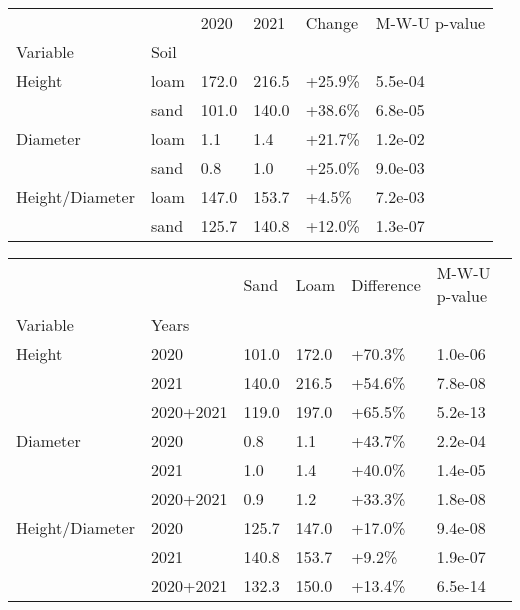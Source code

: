\documentclass[11pt]{article}
\begin{document}
\begin{tabular}{llllll}
\toprule
                &      &   2020 &   2021 &  Change & M-W-U p-value \\
Variable & Soil &        &        &         &               \\
\midrule
Height & loam &  172.0 &  216.5 &  +25.9\% &       5.5e-04 \\
                & sand &  101.0 &  140.0 &  +38.6\% &       6.8e-05 \\
Diameter & loam &    1.1 &    1.4 &  +21.7\% &       1.2e-02 \\
                & sand &    0.8 &    1.0 &  +25.0\% &       9.0e-03 \\
Height/Diameter & loam &  147.0 &  153.7 &   +4.5\% &       7.2e-03 \\
                & sand &  125.7 &  140.8 &  +12.0\% &       1.3e-07 \\
\bottomrule
\end{tabular}

\begin{tabular}{llllll}
\toprule
                &           &   Sand &   Loam & Difference & M-W-U p-value \\
Variable & Years &        &        &            &               \\
\midrule
Height & 2020 &  101.0 &  172.0 &     +70.3\% &       1.0e-06 \\
                & 2021 &  140.0 &  216.5 &     +54.6\% &       7.8e-08 \\
                & 2020+2021 &  119.0 &  197.0 &     +65.5\% &       5.2e-13 \\
Diameter & 2020 &    0.8 &    1.1 &     +43.7\% &       2.2e-04 \\
                & 2021 &    1.0 &    1.4 &     +40.0\% &       1.4e-05 \\
                & 2020+2021 &    0.9 &    1.2 &     +33.3\% &       1.8e-08 \\
Height/Diameter & 2020 &  125.7 &  147.0 &     +17.0\% &       9.4e-08 \\
                & 2021 &  140.8 &  153.7 &      +9.2\% &       1.9e-07 \\
                & 2020+2021 &  132.3 &  150.0 &     +13.4\% &       6.5e-14 \\
\bottomrule
\end{tabular}
\end{document}
